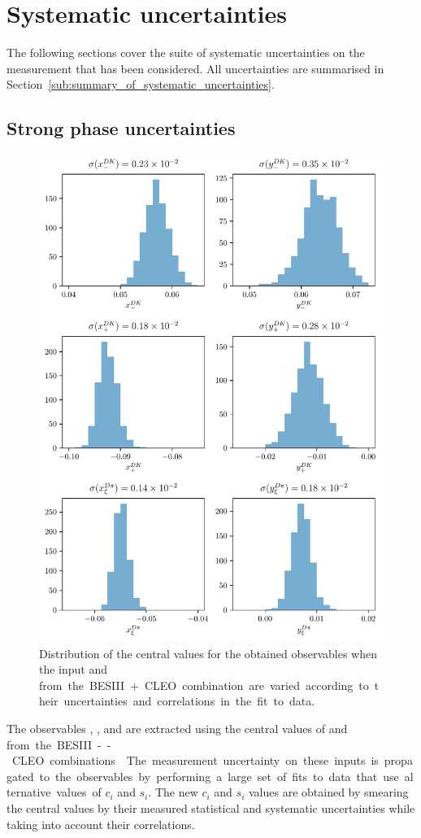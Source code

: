 \section{Systematic uncertainties} %
\label{sec:systematic_uncertainties}

The following sections cover the suite of systematic uncertainties on the measurement that has been considered. All uncertainties are summarised in Section~\ref{sub:summary_of_systematic_uncertainties}.

\subsection{Strong phase uncertainties} %
\label{sub:strong_phase_uncertainties}
\begin{figure}[tp]
    \centering
    \includegraphics[width=0.7\columnwidth]{figures/analysis/systematics/strong_phase_variation.pdf}
    \caption{Distribution of the central values for the obtained observables when the input \ci and \si from the BESIII+CLEO combination are varied according to their uncertainties and correlations in the fit to data. 
    }
    \label{fig:cisi_variation}
\end{figure}
The observables \xpmdk, \ypmdk, \xxidpi and \yxidpi are extracted using the central values of \ci and \si from the BESIII--CLEO combinations~\cite{CLEOCISI,BESCISI,BESCISIKSKK}. The measurement uncertainty on these inputs is propagated to the observables by performing a large set of fits to data that use alternative values of $c_i$ and $s_i$. The new $c_i$ and $s_i$ values are obtained by smearing the central values by their measured statistical and systematic uncertainties while taking into account their correlations. 

